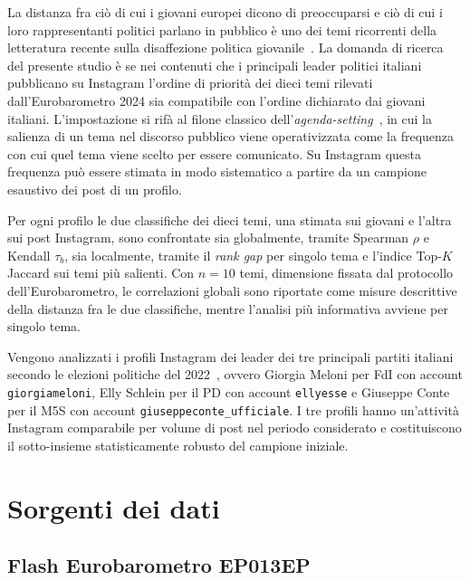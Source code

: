 \documentclass[11pt, a4paper]{article}
\begin{document}
La distanza fra ci\`o di cui i giovani europei dicono di preoccuparsi e
ci\`o di cui i loro rappresentanti politici parlano in pubblico \`e uno
dei temi ricorrenti della letteratura recente sulla disaffezione politica
giovanile~\cite{ep2024youth, eurobarometer_program}. La domanda di
ricerca del presente studio \`e se nei contenuti che i principali leader
politici italiani pubblicano su Instagram l'ordine di priorit\`a dei
dieci temi rilevati dall'Eurobarometro 2024 sia compatibile con l'ordine
dichiarato dai giovani italiani. L'impostazione si rif\`a al filone
classico dell'\textit{agenda-setting}~\cite{mccombs1972}, in cui la
salienza di un tema nel discorso pubblico viene operativizzata come la
frequenza con cui quel tema viene scelto per essere comunicato. Su
Instagram questa frequenza pu\`o essere stimata in modo sistematico a
partire da un campione esaustivo dei post di un profilo.

Per ogni profilo le due classifiche dei dieci temi, una stimata sui
giovani e l'altra sui post Instagram, sono confrontate sia globalmente,
tramite Spearman $\rho$ e Kendall $\tau_b$, sia localmente, tramite il
\textit{rank gap} per singolo tema e l'indice Top-$K$ Jaccard sui temi
pi\`u salienti. Con $n=10$ temi, dimensione fissata dal protocollo
dell'Eurobarometro, le correlazioni globali sono riportate come misure
descrittive della distanza fra le due classifiche, mentre l'analisi
pi\`u informativa avviene per singolo tema.

Vengono analizzati i profili Instagram dei leader dei tre principali
partiti italiani secondo le elezioni politiche del
2022~\cite{italianelections2022}, ovvero Giorgia Meloni per FdI con
account \texttt{giorgiameloni}, Elly Schlein per il PD con account
\texttt{ellyesse} e Giuseppe Conte per il M5S con account
\texttt{giuseppeconte\_ufficiale}. I tre profili hanno un'attivit\`a
Instagram comparabile per volume di post nel periodo considerato e
costituiscono il sotto-insieme statisticamente robusto del campione
iniziale.

\section{Sorgenti dei dati}

\subsection{Flash Eurobarometro EP013EP}
\end{document}
